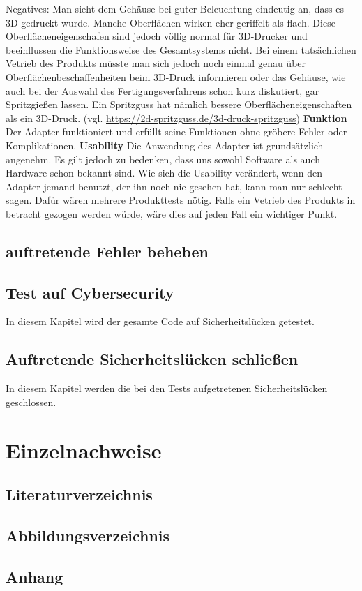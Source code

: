 \documentclass[]{article}
\begin{document}
Negatives:\newline
Man sieht dem Gehäuse bei guter Beleuchtung eindeutig an, dass es 3D-gedruckt wurde. Manche Oberflächen wirken eher geriffelt als flach. Diese Oberflächeneigenschafen sind jedoch völlig normal für 3D-Drucker und beeinflussen die Funktionsweise des Gesamtsystems nicht. Bei einem tatsächlichen Vetrieb des Produkts müsste man sich jedoch noch einmal genau über Oberflächenbeschaffenheiten beim 3D-Druck informieren oder das Gehäuse, wie auch bei der Auswahl des Fertigungsverfahrens schon kurz diskutiert, gar Spritzgießen lassen. Ein Spritzguss hat nämlich bessere Oberflächeneigenschaften als ein 3D-Druck.
\vspace{4mm}\newline
(vgl. \url{https://2d-spritzguss.de/3d-druck-spritzguss})
\vspace{4mm}\newline
\textbf{Funktion}\newline
Der Adapter funktioniert und erfüllt seine Funktionen ohne gröbere Fehler oder Komplikationen.
\vspace{4mm}\newline
\textbf{Usability}\newline
Die Anwendung des Adapter ist grundsätzlich angenehm. Es gilt jedoch zu bedenken, dass uns sowohl Software als auch Hardware schon bekannt sind. Wie sich die Usability verändert, wenn den Adapter jemand benutzt, der ihn noch nie gesehen hat, kann man nur schlecht sagen. Dafür wären mehrere Produkttests nötig. Falls ein Vetrieb des Produkts in betracht gezogen werden würde, wäre dies auf jeden Fall ein wichtiger Punkt.
\subsection{auftretende Fehler beheben}
\subsection{Test auf Cybersecurity}
In diesem Kapitel wird der gesamte Code auf Sicherheitslücken getestet.
\subsection{Auftretende Sicherheitslücken schließen}
In diesem Kapitel werden die bei den Tests aufgetretenen Sicherheitslücken geschlossen.

\section{Einzelnachweise}
\subsection{Literaturverzeichnis}
\subsection{Abbildungsverzeichnis}
\listoffigures
\subsection{Anhang}
\end{document}
